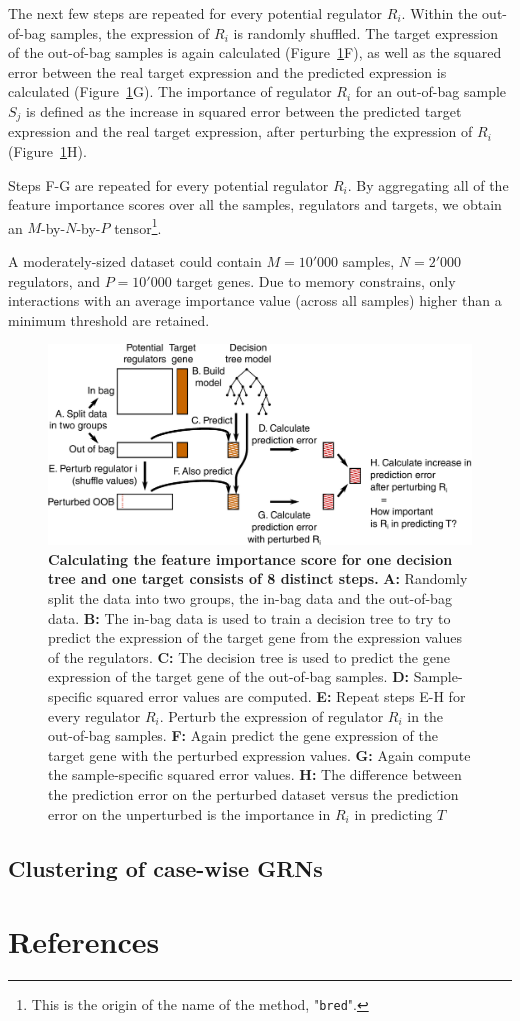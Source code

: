 The next few steps are repeated for every potential regulator $R_i$. Within the out-of-bag samples, the expression of $R_i$ is randomly shuffled. The target expression of the out-of-bag samples is again calculated (Figure~\ref{fig:fimp}F), as well as the squared error between the real target expression and the predicted expression is calculated (Figure~\ref{fig:fimp}G). The importance of regulator $R_i$ for an out-of-bag sample $S_j$ is defined as the increase in squared error between the predicted target expression and the real target expression, after perturbing the expression of $R_i$ (Figure~\ref{fig:fimp}H). 

Steps F-G are repeated for every potential regulator $R_i$. By aggregating all of the feature importance scores over all the samples, regulators and targets, we obtain an $M$-by-$N$-by-$P$ tensor\footnote{This is the origin of the name of the method, "\texttt{bred}".}. 

A moderately-sized dataset could contain $M=10'000$ samples, $N=2'000$ regulators, and $P=10'000$ target genes. Due to memory constrains, only interactions with an average importance value (across all samples) higher than a minimum threshold are retained.


\begin{figure}[htb!]
	\centering
	\includegraphics[width=.9\linewidth]{fig/methodology/fimp.pdf} 
	\caption{
		\textbf{Calculating the feature importance score for one decision tree and one target consists of 8 distinct steps.}
		\textbf{A:} Randomly split the data into two groups, the in-bag data and the out-of-bag data.
		\textbf{B:} The in-bag data is used to train a decision tree to try to predict the expression of the target gene from the expression values of the regulators.
		\textbf{C:} The decision tree is used to predict the gene expression of the target gene of the out-of-bag samples.
		\textbf{D:} Sample-specific squared error values are computed.
		\textbf{E:} Repeat steps E-H for every regulator $R_i$. Perturb the expression of regulator $R_i$ in the out-of-bag samples.
		\textbf{F:} Again predict the gene expression of the target gene with the perturbed expression values.
		\textbf{G:} Again compute the sample-specific squared error values.
		\textbf{H:} The difference between the prediction error on the perturbed dataset versus the prediction error on the unperturbed is the importance in $R_i$ in predicting $T$ 
	}
	\label{fig:fimp}
\end{figure}

\subsection{Clustering of case-wise GRNs}


\clearpage
\section{References}
\printbibliography[heading=none]

